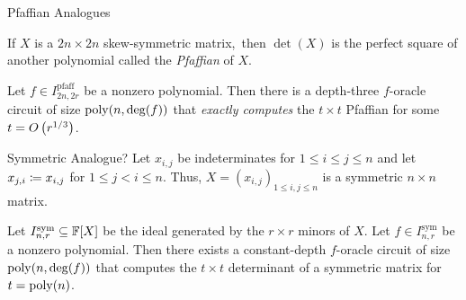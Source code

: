 \documentclass[aspectratio=169]{beamer}
\DeclareMathOperator{\pfaff}{pfaff}
\DeclareMathOperator{\sym}{sym}
\begin{document}
\begin{frame}{Pfaffian Analogues}
    \begin{definition}
        If $X$ is a $2n \times 2n$ skew-symmetric matrix,\pause\ then $\det(X)$ is the perfect square of another polynomial called the \emph{Pfaffian} of $X$.
    \end{definition}

    \pause
    \vspace{20pt}

    \begin{thrm}[{\cite[Theorem 1.6]{DG25}}]
        Let $f \in I^{\pfaff}_{2n, 2r}$ be a nonzero polynomial.
        Then there is a depth-three $f$-oracle circuit of size $\operatorname{poly}(n, \deg(f))$ that \emph{exactly computes} the $t \times t$ Pfaffian for some $t = O\kern-0.0pt\left(r^{1 / 3}\right)$.
    \end{thrm}
    
\end{frame}

\begin{frame}{Symmetric Analogue?}
  Let $x_{i, j}$ be indeterminates for $1 \leq i \leq j \leq n$ and let $x_{j, i} \coloneqq x_{i, j}$ for $1 \leq j < i \leq n$.
  Thus, $X = (x_{i, j})_{1 \leq i, j \leq n}$ is a symmetric $n \times n$ matrix.

  \pause
  \vspace{10pt}

  \begin{conj}\label{conj:sym}
    Let $I^{\sym}_{n, r} \subseteq \F[X]$ be the ideal generated by the $r \times r$ minors of $X$.
    Let $f \in I^{\sym}_{n, r}$ be a nonzero polynomial.
    Then there exists a constant-depth $f$-oracle circuit of size $\operatorname{poly}(n, \deg(f))$ that computes the $t \times t$ determinant of a symmetric matrix for $t = \operatorname{poly}(n)$.
  \end{conj}
\end{frame}
\end{document}
